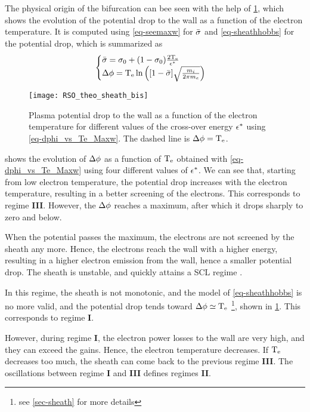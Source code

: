   
   The physical origin of the bifurcation can bee seen with the help of \cref{fig-dphivsTe}, which shows the evolution of the potential drop to the wall as a function of the electron temperature.
   It is computed using \cref{eq-seemaxw} for $ \bar{\sigma }$ and \cref{eq-sheathhobbs} for the potential drop, which is summarized as 
   \begin{equation} \label{eq-dphi_vs_Te_Maxw}
     \begin{cases}
        \bar{\sigma } = \sigma _0 + (1- \sigma _0) \frac{2 \mathrm{T_e}}{\epsilon^{*}} \\
       \Delta \phi = \mathrm{T_e} \ln \left( [1 -  \bar{\sigma }] \sqrt{ \frac{m_i}{2 \pi m_e}}  \right)
     \end{cases}
   \end{equation}
   \begin{figure}[hbtp]
     \centering
     \texttt{[image: RSO\_theo\_sheath\_bis]}
     \caption{Plasma potential drop to the wall as a function of the electron temperature for different values of the cross-over energy $\epsilon^{*}$ using \cref{eq-dphi_vs_Te_Maxw}. The dashed line is $\Delta \phi=\mathrm{T_e}$. }
     \label{fig-dphivsTe}
   \end{figure}
   
    shows the evolution of $\Delta \phi$ as a function of $\mathrm{T_e}$ obtained with \cref{eq-dphi_vs_Te_Maxw} using four different values of $\epsilon^{*}$. 
   We can see that, starting from low electron temperature, the potential drop increases with the electron temperature, resulting in a better screening of the electrons.
   This corresponds to regime {\bf III}.
   However, the $\Delta \phi$ reaches a maximum, after which it drops sharply to zero and below.
   
   When the potential passes the maximum, the electrons are not screened by the sheath any more.
   Hence, the electrons reach the wall with a higher energy, resulting in a higher electron emission from the wall, hence a smaller potential drop.
   The sheath is unstable, and quickly attains a \ac{SCL} regime \citep{raitses2005}.
   
   In this regime, the sheath is not monotonic, and the model of \cref{eq-sheathhobbs} is no more valid, and the potential drop tends toward $\Delta \phi \simeq \mathrm{T_e}$ \citep{hobbs1967,goebel2008} \footnote{see \cref{sec-sheath} for more details}, shown in \cref{fig-dphivsTe}.
   This corresponds to regime {\bf I}.
   
   However, during regime {\bf I}, the electron power losses to the wall are very high, and they can exceed the gains.
   Hence, the electron temperature decreases.
   If $\mathrm{T_e}$ decreases too much, the sheath can come back to the previous regime {\bf III}.
   The oscillations between regime {\bf I} and {\bf III} defines regimes {\bf II}.
      
